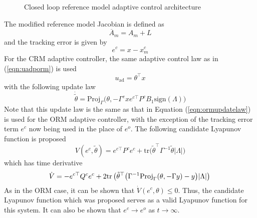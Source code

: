 \begin{figure}[h]
\begin{center}
    \caption{Closed loop reference model adaptive control architecture\label{fig:crmblock}}
  \end{center}
\end{figure}

The modified reference model Jacobian is defined as
\begin{equation}
  \label{eqn:ambar}
  \overline{A}_{m}=A_{m}+L
\end{equation}
and the tracking error is given by
\begin{equation}
  \label{eqn:ecerror}
  e^{c}=x-x_{m}^{c}
\end{equation}
For the CRM adaptive controller, the same adaptive control law as in (\ref{eqn:uadporm}) is used
\begin{equation}
  \label{eqn:uadpcrm}
  u_{\text{ad}}=\theta^{\top}x
\end{equation}
with the following update law
\begin{equation}
  \label{eqn:crmupdatelaw}
  \dot{\tilde{\theta}}=\text{Proj}_{\Gamma}\bigr(\theta,-\Gamma^{c} xe^{c\top}P^{c}B_{1}\text{sign}(\Lambda)\bigr)
\end{equation}
Note that this update law is the same as that in Equation (\ref{eqn:ormupdatelaw}) is used for the ORM adaptive controller, with the exception of the tracking error term $e^{c}$ now being used in the place of $e^{o}$.
The following candidate Lyapunov function is proposed
\begin{equation}
  V(e^{c},\tilde{\theta})=e^{c\top}P^{c}e^{c}+\text{tr}\bigr(\tilde{\theta}^{\top}\Gamma^{-1}\tilde{\theta}|\Lambda|\bigr)
\end{equation}
which has time derivative
\begin{equation}
  \dot{V}=-e^{c\top}Q^{c}e^{c}
  +2\text{tr}\left(\tilde{\theta}^{\top}\bigr(\Gamma^{-1}\text{Proj}_{\Gamma}(\theta,-\Gamma y)-y\bigr)|\Lambda|\right) \\
\end{equation}
As in the ORM case, it can be shown that $\dot{V}(e^{c},\theta)\leq 0$.
Thus, the candidate Lyapunov function which was proposed serves as a valid Lyapunov function for this system.
It can also be shown that $e^{c}\rightarrow e^{o}$ as $t\rightarrow\infty$.

